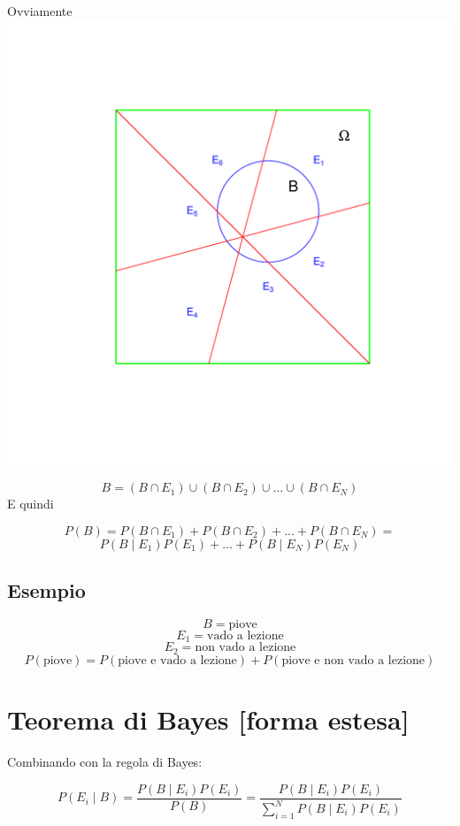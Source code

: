 \documentclass[onecolumn,12pt]{book}\usepackage[]{graphicx}\usepackage[]{color}
\makeatletter
\def\maxwidth{ %
  \ifdim\Gin@nat@width>\linewidth
    \linewidth
  \else
    \Gin@nat@width
  \fi
}
\newenvironment{knitrout}{}{} %
\makeatother
\begin{document}
Ovviamente
\begin{knitrout}
\color{fgcolor}
\includegraphics[width=\maxwidth]{figure/r-1} 

\end{knitrout}
$$B=(B\cap E_1)\cup (B\cap E_2)\cup\ldots \cup (B\cap E_N)$$
E quindi

$$P(B)=P(B\cap E_1)+P(B\cap E_2)+\ldots+ P(B\cap E_N)=$$
$$ P(B\mid E_1)P(E_1)+\ldots+P(B\mid E_N)P(E_N)$$

\subsection{Esempio}

$$B=\textrm{piove}$$
$$E_1 = \textrm{vado a lezione}$$
$$E_2 = \textrm{non vado a lezione}$$
$$P(\textrm{piove}) = P(\textrm{piove e vado a lezione}) + P(\textrm{piove e non vado a lezione}) $$ 

 

\section{Teorema di Bayes [forma estesa]}

Combinando con la regola di Bayes:

$$P (E_i\mid B) = \dfrac{P(B\mid E_i) P(E_i)}{P(B)}= \dfrac{P(B\mid E_i ) P(E_i) }{ 
\sum_{i=1}^N P(B\mid E_i)P(E_i)}$$
\end{document}
